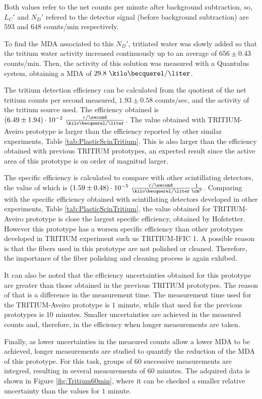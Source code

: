 Both values refer to the net counts per minute after background subtraction, so, $L_C'$ and $N_D'$ refered to the detector signal (before background subtraction) are $593$ and $648$ counts/min respectively.

To find the MDA associated to this $N_D'$, tritiated water was slowly added  so that the tritium water activity increased continuously up to an average of $656 \pm 0.43$ counts/min. Then, the activity of this solution was measured with a Quantulus system, obtaining a MDA of $29.8~\kilo\becquerel/\liter$.

The tritium detection efficiency can be calculated from the quotient of the net tritium counts per second measured, $1.93 \pm 0.58$ counts/sec, and the activity of the tritium source used. The efficiency obtained is $(6.49 \pm 1.94)\cdot{} 10^{-2}~ \frac{\text{c}/\second}{\kilo\becquerel/\liter}$.  The value obtained with TRITIUM-Aveiro prototype is larger than the efficiency reported by other similar experiments, Table \ref{tab:PlasticScinTritium}. This is also larger than the efficiency obtained with previous TRITIUM prototypes, an expected result since the active area of this prototype is on order of magnitud larger.

The specific efficiency is calculated to compare with other scintillating detectors, the value of which is $(1.59 \pm 0.48)\cdot{} 10^{-5}~ \frac{\text{c}/\second}{\kilo\becquerel/\liter}\frac{1}{\cm^{2}}$. Comparing with the specific efficiency obtained with scintillating detectors developed in other experiments, Table \ref{tab:PlasticScinTritium}, the value obtained for TRITIUM-Aveiro prototype is close the largest specific efficiency, obtained by Hofstetter. However this prototype has a worsen specific efficiency than other prototypes developed in TRITIUM experiment such us TRITIUM-IFIC 1. A possible reason is that the fibers used in this prototype are not polished or cleaned. Therefore, the importance of the fiber polishing and cleaning process is again exhibed.

It can also be noted that the efficiency uncertainties obtained for this prototype are greater than those obtained in the previous TRITIUM prototypes. The reason of that is a difference in the measurement time. The measurement time used for the TRITIUM-Aveiro prototype is $1$ minute, while that used for the previous prototypes is $10$ minutes. Smaller uncertainties are achieved in the measured counts and, therefore, in the efficiency when longer measurements are taken.

Finally, as lower uncertainties in the measured counts allow a lower MDA to be achieved, longer measurements are studied to quantify the reduction of the MDA of this prototype. For this task, groups of 60 successive measurements are integred, resulting in several measurements of 60 minutes. The adquired data is shown in Figure \ref{fig:Tritium60min}, where it can be checked a smaller relative uncertainty than the values for $1$ minute.

